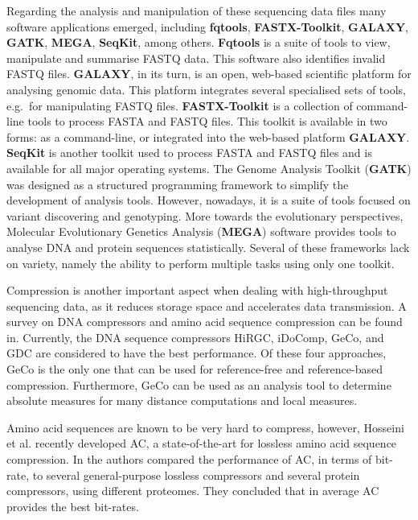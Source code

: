 \documentclass[11pt,]{krantz}
\begin{document}
Regarding the analysis and manipulation of these sequencing data files
many software applications emerged, including
\textbf{fqtools}\citep{droop2016fqtools},
\textbf{FASTX-Toolkit}\citep{gordon2010fastx},
\textbf{GALAXY}\citep{afgan2018galaxy},
\textbf{GATK}\citep{depristo2011framework},
\textbf{MEGA}\citep{kumar2016mega7},
\textbf{SeqKit}\citep{shen2016seqkit}, among others. \textbf{Fqtools} is
a suite of tools to view, manipulate and summarise FASTQ data. This
software also identifies invalid FASTQ files\citep{droop2016fqtools}.
\textbf{GALAXY}, in its turn, is an open, web-based scientific platform
for analysing genomic data\citep{goecks2010galaxy}. This platform
integrates several specialised sets of tools, e.g.~for manipulating
FASTQ files\citep{blankenberg2010manipulation}. \textbf{FASTX-Toolkit}
is a collection of command-line tools to process FASTA and FASTQ files.
This toolkit is available in two forms: as a command-line, or integrated
into the web-based platform \textbf{GALAXY}\citep{gordon2010fastx}.
\textbf{SeqKit} is another toolkit used to process FASTA and FASTQ files
and is available for all major operating systems\citep{shen2016seqkit}.
The Genome Analysis Toolkit (\textbf{GATK}) was designed as a structured
programming framework to simplify the development of analysis tools.
However, nowadays, it is a suite of tools focused on variant discovering
and genotyping\citep{van2013fastq}. More towards the evolutionary
perspectives, Molecular Evolutionary Genetics Analysis (\textbf{MEGA})
software provides tools to analyse DNA and protein sequences
statistically\citep{tamura2011mega5}. Several of these frameworks lack
on variety, namely the ability to perform multiple tasks using only one
toolkit.

Compression is another important aspect when dealing with
high-throughput sequencing data, as it reduces storage space and
accelerates data transmission. A survey on DNA compressors and amino
acid sequence compression can be found in\citep{hosseini2016survey}.
Currently, the DNA sequence compressors HiRGC\citep{liu2017high},
iDoComp\citep{ochoa2014idocomp}, GeCo\citep{pratas2016efficient}, and
GDC\citep{deorowicz2015gdc} are considered to have the best
performance\citep{hernaez2019genomic}. Of these four approaches, GeCo is
the only one that can be used for reference-free and reference-based
compression. Furthermore, GeCo can be used as an analysis tool to
determine absolute measures for many distance computations and local
measures\citep{pratas2016efficient}.

Amino acid sequences are known to be very hard to
compress\citep{nalbantoglu2010data}, however, Hosseini et
al.\citep{hosseini2019ac} recently developed AC, a state-of-the-art for
lossless amino acid sequence compression.
In\citep{pratas2018compression} the authors compared the performance of
AC, in terms of bit-rate, to several general-purpose lossless
compressors and several protein compressors, using different proteomes.
They concluded that in average AC provides the best bit-rates.
\end{document}
